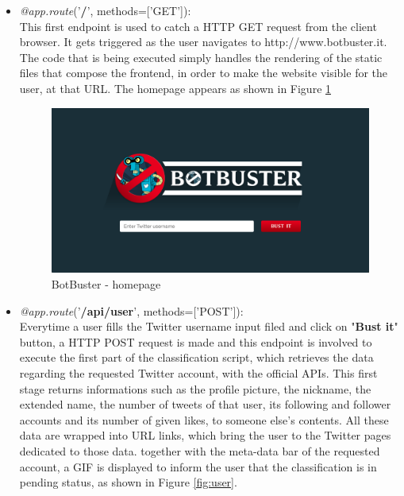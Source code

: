 \begin{itemize}
	\item[\PencilRight] \textit{@app.route}('\textbf{/}', methods=['GET']):\\
	This first endpoint is used to catch a HTTP GET request from the client browser.
	It gets triggered as the user navigates to http://www.botbuster.it. The code that is being executed simply handles the rendering of the static files that compose the frontend, in order to make the website visible for the user, at that URL. The homepage appears as shown in Figure \ref{fig:homepage}
	\begin{figure}[htp!]
		\begin{center}
			\includegraphics[width=\columnwidth]{chapter7/figure/homepage.png}\par 
		\end{center}
		\caption{BotBuster - homepage}
		\label{fig:homepage}
	\end{figure}
	\item[\PencilRight] \textit{@app.route}('\textbf{/api/user}', methods=['POST']):\\
	 Everytime a user fills the Twitter username input filed and click on "\textbf{Bust it}" button, a HTTP POST request is made and this endpoint is involved to execute the first part of the classification script, which retrieves the data regarding the requested Twitter account, with the official APIs. This first stage returns informations such as the profile picture, the nickname, the extended name, the number of tweets of that user, its following and follower accounts and its number of given likes, to someone else's contents.
	 All these data are wrapped into URL links, which bring the user to the Twitter pages dedicated to those data. together with the meta-data bar of the requested account, a GIF is displayed to inform the user that the classification is in pending status, as shown in Figure \ref{fig:user}.

\end{itemize}
